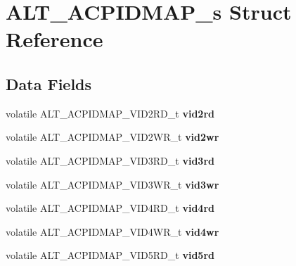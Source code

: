 \hypertarget{structALT__ACPIDMAP__s}{}\section{A\+L\+T\+\_\+\+A\+C\+P\+I\+D\+M\+A\+P\+\_\+s Struct Reference}
\label{structALT__ACPIDMAP__s}
\subsection*{Data Fields}
\begin{DoxyCompactItemize}
\item 
\mbox{\label{structALT__ACPIDMAP__s_a9d5f6fc443b906b4222c305a8218dec4}} 
volatile A\+L\+T\+\_\+\+A\+C\+P\+I\+D\+M\+A\+P\+\_\+\+V\+I\+D2\+R\+D\+\_\+t {\bfseries vid2rd}
\item 
\mbox{\label{structALT__ACPIDMAP__s_aa42977d948ef71f5306b407727329302}} 
volatile A\+L\+T\+\_\+\+A\+C\+P\+I\+D\+M\+A\+P\+\_\+\+V\+I\+D2\+W\+R\+\_\+t {\bfseries vid2wr}
\item 
\mbox{\label{structALT__ACPIDMAP__s_a80915e205d2fc4f8c4c33f5b392ad130}} 
volatile A\+L\+T\+\_\+\+A\+C\+P\+I\+D\+M\+A\+P\+\_\+\+V\+I\+D3\+R\+D\+\_\+t {\bfseries vid3rd}
\item 
\mbox{\label{structALT__ACPIDMAP__s_a4589778a156fbb0931aed6238cdb1e28}} 
volatile A\+L\+T\+\_\+\+A\+C\+P\+I\+D\+M\+A\+P\+\_\+\+V\+I\+D3\+W\+R\+\_\+t {\bfseries vid3wr}
\item 
\mbox{\label{structALT__ACPIDMAP__s_a1b797748b440c601922ee52c98a20032}} 
volatile A\+L\+T\+\_\+\+A\+C\+P\+I\+D\+M\+A\+P\+\_\+\+V\+I\+D4\+R\+D\+\_\+t {\bfseries vid4rd}
\item 
\mbox{\label{structALT__ACPIDMAP__s_a575d8fd8b74c597d1452dcef1243e717}} 
volatile A\+L\+T\+\_\+\+A\+C\+P\+I\+D\+M\+A\+P\+\_\+\+V\+I\+D4\+W\+R\+\_\+t {\bfseries vid4wr}
\item 
\mbox{\label{structALT__ACPIDMAP__s_ad794fd1e8b1c41eda71387c0eb7196a7}} 
volatile A\+L\+T\+\_\+\+A\+C\+P\+I\+D\+M\+A\+P\+\_\+\+V\+I\+D5\+R\+D\+\_\+t {\bfseries vid5rd}
\item 

\end{DoxyCompactItemize}
